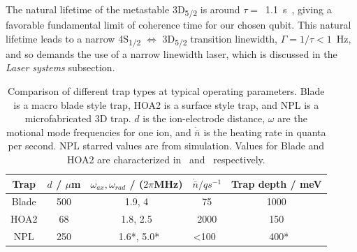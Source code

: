 \documentclass[12pt]{iopart}
\begin{document}
The natural lifetime of the metastable 3D\textsubscript{5/2} is around
$\tau =$~1.1~s~\cite{barton_measurement_2000}, giving a favorable fundamental limit of coherence
time for our chosen qubit.  This natural lifetime leads to a narrow
4S\textsubscript{1/2} $\Leftrightarrow$ 3D\textsubscript{5/2}
transition linewidth, $\Gamma = 1/\tau < 1$~Hz, and so demands the use of a
narrow linewidth laser, which is discussed in the \textit{Laser
  systems} subsection.

\begin{table}[h!]
\begin{center}
\begin{tabular}{ c|c c c c }
  Trap & $d$ / $\mu$m & $\omega_{ax}, \omega_{rad}$ / ($2\pi$MHz) & $\dot{\bar{n}} / qs^{-1}$ & Trap depth / meV \\ 
  \hline
  Blade  & 500 & 1.9, 4 & 75 & 1000 \\
  HOA2  & 68 & 1.8, 2.5 & 2000 & 150 \\
  NPL  & 250 & ~1.6*, 5.0* & <100~ & ~400* 
\end{tabular}
\caption{Comparison of different trap types at typical operating
  parameters. Blade is a macro blade style trap, HOA2 is a surface
  style trap, and NPL is a microfabricated 3D trap. $d$ is the
  ion-electrode distance, $\omega$ are the motional mode frequencies
  for one ion, and $\dot{\bar{n}}$ is the heating rate in quanta per
  second. NPL starred values are from simulation. Values for Blade and
  HOA2 are characterized in~\cite{schafer_fast_2020, hughes_benchmarking_2021} and~\cite{nadlinger_device-independent_2022, nichol_thesis_2022}
  respectively. }
\label{table:trap}

\end{center}
\end{table}
\end{document}

